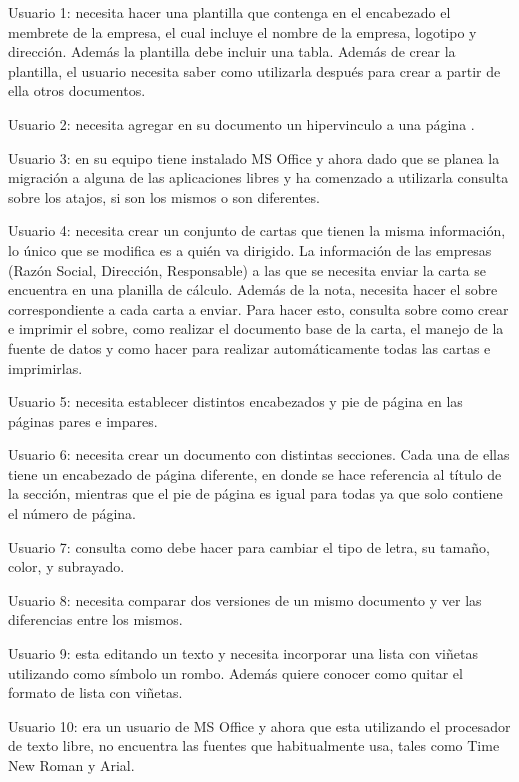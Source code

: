 \documentclass[12pt]{article}
\begin{document}
\begin{description}

    \item{Usuario 1}: necesita hacer una plantilla que contenga en el
    encabezado el membrete de la empresa, el cual incluye el nombre de la
    empresa, logotipo y dirección. Además la plantilla debe incluir una tabla.
    Además de crear la plantilla, el usuario necesita saber como utilizarla
    después para crear a partir de ella otros documentos.

    \item{Usuario 2}: necesita agregar en su documento un hipervinculo a una
    página .

    \item{Usuario 3}: en su equipo tiene instalado MS Office y ahora dado que
    se planea la migración a alguna de las aplicaciones libres y ha comenzado
    a utilizarla consulta sobre los atajos, si son los mismos o son diferentes.

    \item{Usuario 4}: necesita crear un conjunto de cartas que tienen la misma
    información, lo único que se modifica es a quién va dirigido. La
    información de las empresas (Razón Social, Dirección, Responsable) a las
    que se necesita enviar la carta se encuentra en una planilla de cálculo.
    Además de la nota, necesita hacer el sobre correspondiente a cada carta a
    enviar. Para hacer esto, consulta sobre como crear e imprimir el sobre,
    como realizar el documento base de la carta, el manejo de la fuente de
    datos y como hacer para realizar automáticamente todas las cartas e
    imprimirlas.

    \item{Usuario 5}: necesita establecer distintos encabezados y pie de
    página en las páginas pares e impares.

    \item{Usuario 6}: necesita crear un documento con distintas secciones.
    Cada una de ellas tiene un encabezado de página diferente, en donde se
    hace referencia al título de la sección, mientras que el pie de página es
    igual para todas ya que solo contiene el número de página.

    \item{Usuario 7}: consulta como debe hacer para cambiar el tipo de letra,
    su tamaño, color, y subrayado.

    \item{Usuario 8}: necesita comparar dos versiones de un mismo documento y
    ver las diferencias entre los mismos.

    \item{Usuario 9}: esta editando un texto y necesita incorporar una lista
    con viñetas utilizando como símbolo un rombo. Además quiere conocer como
    quitar el formato de lista con viñetas.

    \item{Usuario 10}: era un usuario de MS Office y ahora que esta utilizando
    el procesador de texto libre, no encuentra las fuentes que habitualmente
    usa, tales como Time New Roman y Arial.

\end{description}
\end{document}
